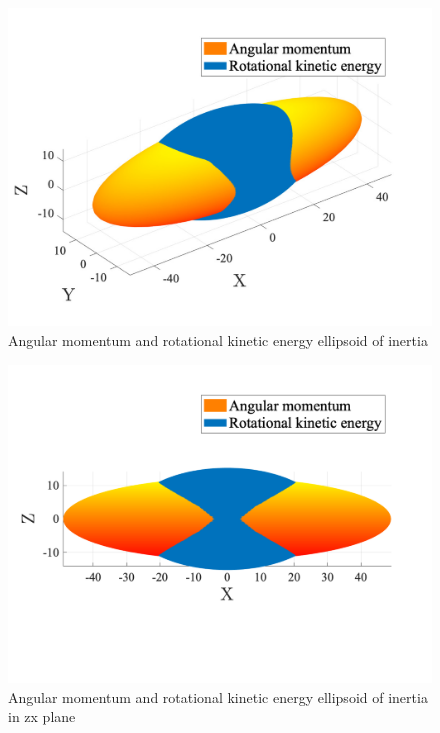\begin{figure}[H]
    \caption{Angular momentum and rotational kinetic energy ellipsoid of inertia}
    \centering
    \includegraphics[width=16cm]{../Figure/Q1/3Dof_view}
\end{figure}
\vspace{-1.5cm}
\begin{figure}[H]
    \caption{Angular momentum and rotational kinetic energy ellipsoid of inertia in zx plane}
    \centering
    \includegraphics[width=12cm]{../Figure/Q1/xz_view}
\end{figure}

